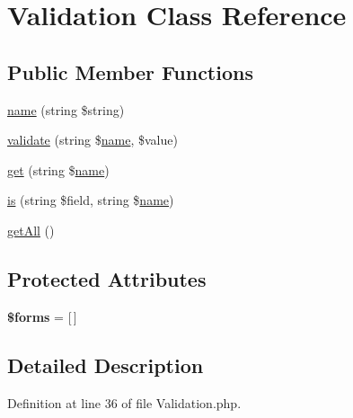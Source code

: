 \hypertarget{classcommon_1_1user_1_1_validation}{\section{\-Validation \-Class \-Reference}
\label{classcommon_1_1user_1_1_validation}
}
\subsection*{\-Public \-Member \-Functions}
\begin{DoxyCompactItemize}
\item 
\hyperlink{classcommon_1_1user_1_1_validation_a678d8bf3db3b3e6c453c1dd55f054482}{name} (string \$string)
\item 
\hyperlink{classcommon_1_1user_1_1_validation_ab52e598c4419ae387fe527c3883ae2c7}{validate} (string \$\hyperlink{classcommon_1_1user_1_1_validation_a678d8bf3db3b3e6c453c1dd55f054482}{name}, \$value)
\item 
\hyperlink{classcommon_1_1user_1_1_validation_a004397797e263171281784084cf4a502}{get} (string \$\hyperlink{classcommon_1_1user_1_1_validation_a678d8bf3db3b3e6c453c1dd55f054482}{name})
\item 
\hyperlink{classcommon_1_1user_1_1_validation_ab2fbcc854e20c3445beb3d3e1f042f8b}{is} (string \$field, string \$\hyperlink{classcommon_1_1user_1_1_validation_a678d8bf3db3b3e6c453c1dd55f054482}{name})
\item 
\hyperlink{classcommon_1_1user_1_1_validation_aba0d5b303383fb5b1fabb5fd01cd3800}{get\-All} ()
\end{DoxyCompactItemize}
\subsection*{\-Protected \-Attributes}
\begin{DoxyCompactItemize}
\item 
\hypertarget{classcommon_1_1user_1_1_validation_a8dcd469e6c336555e43c3003b0a0da54}{{\bfseries \$forms} = \mbox{[}$\,$\mbox{]}}\label{classcommon_1_1user_1_1_validation_a8dcd469e6c336555e43c3003b0a0da54}

\end{DoxyCompactItemize}


\subsection{\-Detailed \-Description}


\-Definition at line 36 of file \-Validation.\-php.



